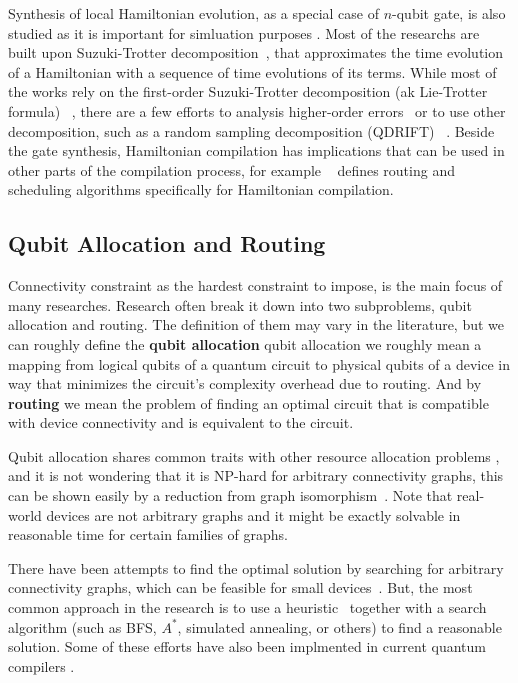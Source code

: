 Synthesis of local Hamiltonian evolution, as a special case of $n$-qubit gate, is also studied as it is important for simluation purposes \cite{childs2018}. Most of the researchs are built upon Suzuki-Trotter decomposition~\cite{trotter1959, suzuki1991}, that approximates the time evolution of a Hamiltonian with a sequence of time evolutions of its terms. While most of the works rely on the first-order Suzuki-Trotter decomposition (ak Lie-Trotter formula) ~\cite{sivarajah2021, qiskit2023}, there are a few efforts to analysis higher-order errors~\cite{childs2021} or to use other decomposition, such as a random sampling decomposition (QDRIFT) ~\cite{campbell2019}. Beside the gate synthesis, Hamiltonian compilation has implications that can be used in other parts of the compilation process, for example ~\cite{lao2021} defines routing and scheduling algorithms specifically for Hamiltonian compilation.


\subsection{Qubit Allocation and Routing}

Connectivity constraint as the hardest constraint to impose, is the main focus of many researches. Research often break it down into two subproblems, qubit allocation and routing. The definition of them may vary in the literature, but we can roughly define the \textbf{qubit allocation} qubit allocation we roughly mean a mapping from logical qubits of a quantum circuit to physical qubits of a device in way that minimizes the circuit's complexity overhead due to routing. And by \textbf{routing} we mean the problem of finding an optimal circuit that is compatible with device connectivity and is equivalent to the circuit.

Qubit allocation shares common traits with other resource allocation problems \cite{alicherry2012},\cite[pp. 440-444]{allen2001} and it is not wondering that it is NP-hard for arbitrary connectivity graphs, this can be shown easily by a reduction from graph isomorphism~\cite{siraichi2018}. Note that real-world devices are not arbitrary graphs and it might be exactly solvable in reasonable time for certain families of graphs. 

There have been attempts to find the optimal solution by searching for arbitrary connectivity graphs, which can be feasible for small devices~\cite{siraichi2018}. But, the most common approach in the research is to use a heuristic~\cite{zhang2021, itoko2019, cowtan2019,paler2019, murali2019} together with a search algorithm (such as BFS, $A^*$\cite{zulehner2018}, simulated annealing\cite{zhou2020}, or others\cite{li2019}) to find a reasonable solution. Some of these efforts have also been implmented in current quantum compilers \cite{qiskit2023,sivarajah2021}.

